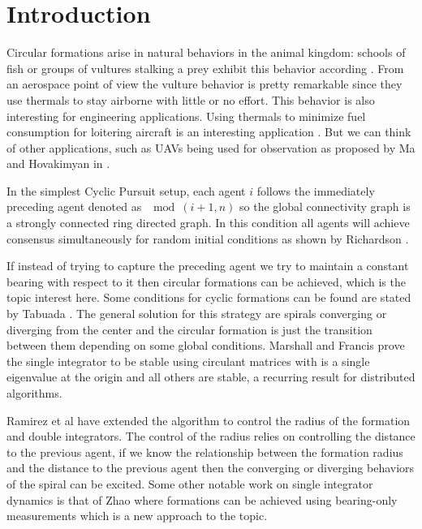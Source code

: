 \section{Introduction}
Circular formations arise in natural behaviors in the animal kingdom: schools of fish \cite{parrish2002self} or groups of vultures stalking a prey exhibit this behavior according \cite{cone1962thermal}. From an aerospace point of view the vulture behavior is pretty remarkable since they use thermals to stay airborne with little or no effort. This behavior is also interesting for engineering applications. Using thermals to minimize fuel consumption for loitering aircraft is an interesting application \cite{akos2010thermal}. But we can think of other applications, such as UAVs being used for observation as proposed by Ma and Hovakimyan in \cite{ma2013cooperative}. 

In the simplest Cyclic Pursuit setup, each agent $i$ follows the immediately preceding agent denoted as $\mod(i+1,n)$ so the global connectivity graph is a strongly connected ring directed graph. In this condition all agents will achieve consensus simultaneously for random initial conditions as shown by Richardson \cite{richardson2001nonmutual}.

If instead of trying to capture the preceding agent we try to maintain a constant bearing with respect to it then circular formations can be achieved, which is the topic interest here. Some conditions for cyclic formations can be found are stated by Tabuada \cite{tabuada2001cylic}. The general solution for this strategy are spirals converging or diverging from the center and the circular formation is just the transition between them depending on some global conditions. Marshall and Francis \cite{marshall2004formations}  prove the single integrator to be stable using circulant matrices with is a single eigenvalue at the origin and all others are stable, a recurring result for distributed algorithms. 

Ramirez et al \cite{ramirez2010distributed} have extended the algorithm to control the radius of the formation and double integrators. The control of the radius relies on controlling the distance to the previous agent, if we know the relationship between the formation radius and the distance to the previous agent then the converging or diverging behaviors of the spiral can be excited. Some other notable work on single integrator dynamics is that of Zhao \cite{zhao2014distributed} where formations can be achieved using bearing-only measurements which is a new approach to the topic.


